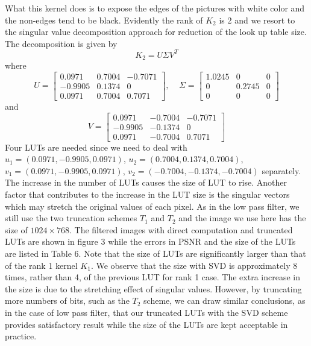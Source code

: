\documentclass[12pt]{amsart}
\theoremstyle{definition}
\theoremstyle{remark}
\numberwithin{thm}{section}
\begin{document}
What this kernel does is to expose the edges of the pictures with white  color and the non-edges tend to be black. Evidently the rank of $K_2$ is 2 and we resort to the singular value decomposition approach for reduction of the look up table size. The decomposition is given by 
$$
K_2=U\Sigma V^T
$$
where
$$
U=
\begin{bmatrix}
 0.0971 & 0.7004 & -0.7071\\
-0.9905 & 0.1374 & 0\\
 0.0971 & 0.7004 & 0.7071
\end{bmatrix}
, \ \ \ \ \ \Sigma=
\begin{bmatrix}
1.0245 & 0 & 0\\
0& 0.2745 & 0\\
0 & 0 & 0
\end{bmatrix}
$$
and
$$
V=
\begin{bmatrix}
 0.0971 & -0.7004 & -0.7071\\
-0.9905 & -0.1374 & 0\\
 0.0971 & -0.7004 & 0.7071
\end{bmatrix}
$$
Four LUTs are needed since we need to deal with $u_1=(0.0971,-0.9905,0.0971)$, $u_2=(0.7004,0.1374,0.7004)$, $v_1=(0.0971,-0.9905,0.0971)$, $v_2=(-0.7004,-0.1374,-0.7004)$ separately. The increase in the number of LUTs causes the size of LUT to rise. Another factor that contributes to the increase in the LUT size is the singular vectors which may stretch the original values of each pixel. As in the low pass filter, we still use the two truncation schemes $T_1$ and $T_2$ and the image we use here has the size of $1024\times 768$. The filtered images with direct computation and truncated LUTs are shown in figure 3 while the errors in PSNR and the size of the LUTs are listed in Table 6. 
Note that the size of LUTs are significantly larger than that of the rank 1 kernel $K_1$. We observe that the size with SVD is approximately 8 times, rather than 4, of the previous LUT for rank 1 case. The extra increase in the size is due to the stretching effect of singular values. However, by truncating more numbers of bits, such as the $T_2$ scheme, we can draw similar conclusions, as in the case of low pass filter, that our truncated LUTs with the SVD scheme provides satisfactory result while the size of the LUTs are kept acceptable in practice. 
\end{document}
